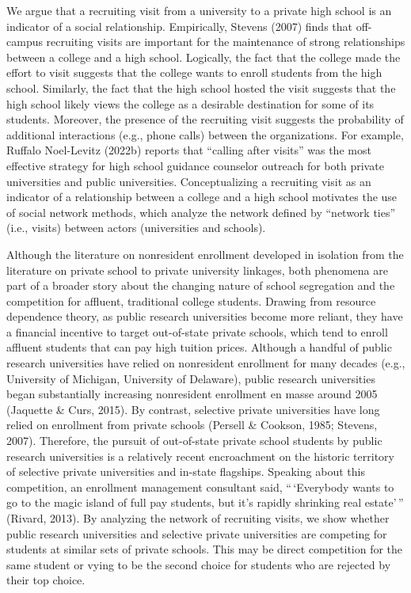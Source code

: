 \documentclass[
  12pt,
]{article}
\begin{document}
We argue that a recruiting visit from a university to a private high school is an indicator of a social relationship. Empirically, Stevens (2007) finds that off-campus recruiting visits are important for the maintenance of strong relationships between a college and a high school. Logically, the fact that the college made the effort to visit suggests that the college wants to enroll students from the high school. Similarly, the fact that the high school hosted the visit suggests that the high school likely views the college as a desirable destination for some of its students. Moreover, the presence of the recruiting visit suggests the probability of additional interactions (e.g., phone calls) between the organizations. For example, Ruffalo Noel-Levitz (2022b) reports that ``calling after visits'' was the most effective strategy for high school guidance counselor outreach for both private universities and public universities. Conceptualizing a recruiting visit as an indicator of a relationship between a college and a high school motivates the use of social network methods, which analyze the network defined by ``network ties'' (i.e., visits) between actors (universities and schools).

Although the literature on nonresident enrollment developed in isolation from the literature on private school to private university linkages, both phenomena are part of a broader story about the changing nature of school segregation and the competition for affluent, traditional college students. Drawing from resource dependence theory, as public research universities become more reliant, they have a financial incentive to target out-of-state private schools, which tend to enroll affluent students that can pay high tuition prices. Although a handful of public research universities have relied on nonresident enrollment for many decades (e.g., University of Michigan, University of Delaware), public research universities began substantially increasing nonresident enrollment en masse around 2005 (Jaquette \& Curs, 2015). By contrast, selective private universities have long relied on enrollment from private schools (Persell \& Cookson, 1985; Stevens, 2007). Therefore, the pursuit of out-of-state private school students by public research universities is a relatively recent encroachment on the historic territory of selective private universities and in-state flagships. Speaking about this competition, an enrollment management consultant said, ``\,`Everybody wants to go to the magic island of full pay students, but it's rapidly shrinking real estate'\,'' (Rivard, 2013). By analyzing the network of recruiting visits, we show whether public research universities and selective private universities are competing for students at similar sets of private schools. This may be direct competition for the same student or vying to be the second choice for students who are rejected by their top choice.
\end{document}

